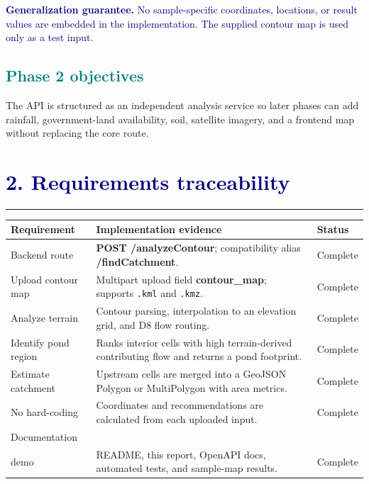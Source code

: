 \documentclass[11pt,a4paper]{article}
\newcommand{\sectionrule}{\textcolor{teal}{\rule{\linewidth}{1.2pt}}}
\newcommand{\reportsection}[1]{\section*{\textcolor{navy}{#1}}\sectionrule\vspace{4pt}}
\newcommand{\reportsubsection}[1]{\subsection*{\textcolor{teal}{#1}}}
\newcommand{\code}[1]{\texttt{#1}}
\newcommand{\metric}[1]{\textcolor{teal}{\textbf{#1}}}
\begin{document}
\noindent\colorbox{mint}{\parbox{\dimexpr\linewidth-2\fboxsep\relax}{\textcolor{navy}{\textbf{Generalization guarantee.} No sample-specific coordinates, locations, or result values are embedded in the implementation. The supplied contour map is used only as a test input.}}}

\reportsubsection{Phase 2 objectives}
\begin{center}
\end{center}

The API is structured as an independent analysis service so later phases can add rainfall, government-land availability, soil, satellite imagery, and a frontend map without replacing the core route.

\reportsection{2. Requirements traceability}
\renewcommand{\arraystretch}{1.25}
\begin{tabularx}{\linewidth}{@{}p{30mm}X p{25mm}@{}}
\toprule
\textbf{Requirement} & \textbf{Implementation evidence} & \textbf{Status}\\
\midrule
Backend route & \textbf{POST /analyzeContour}; compatibility alias \textbf{/findCatchment}. & Complete\\
Upload contour map & Multipart upload field \textbf{contour\_map}; supports \code{.kml} and \code{.kmz}. & Complete\\
Analyze terrain & Contour parsing, interpolation to an elevation grid, and D8 flow routing. & Complete\\
Identify pond region & Ranks interior cells with high terrain-derived contributing flow and returns a pond footprint. & Complete\\
Estimate catchment & Upstream cells are merged into a GeoJSON Polygon or MultiPolygon with area metrics. & Complete\\
No hard-coding & Coordinates and recommendations are calculated from each uploaded input. & Complete\\
Documentation\\demo & README, this report, OpenAPI docs, automated tests, and sample-map results. & Complete\\
\bottomrule
\end{tabularx}
\end{document}
